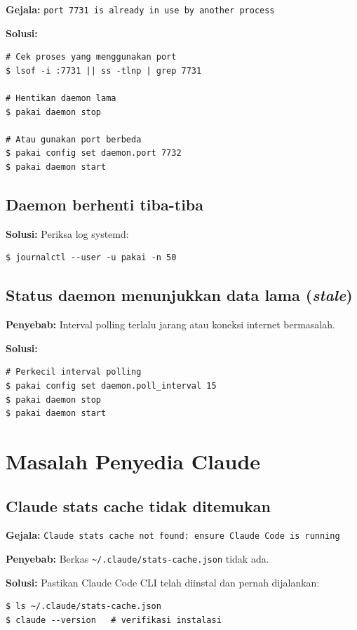 \textbf{Gejala:} \texttt{port 7731 is already in use by another process}

\textbf{Solusi:}
\begin{lstlisting}[style=terminal]
# Cek proses yang menggunakan port
$ lsof -i :7731 || ss -tlnp | grep 7731

# Hentikan daemon lama
$ pakai daemon stop

# Atau gunakan port berbeda
$ pakai config set daemon.port 7732
$ pakai daemon start
\end{lstlisting}

\subsection{Daemon berhenti tiba-tiba}

\textbf{Solusi:} Periksa log systemd:
\begin{lstlisting}[style=terminal]
$ journalctl --user -u pakai -n 50
\end{lstlisting}

\subsection{Status daemon menunjukkan data lama (\textit{stale})}

\textbf{Penyebab:} Interval polling terlalu jarang atau koneksi internet bermasalah.

\textbf{Solusi:}
\begin{lstlisting}[style=terminal]
# Perkecil interval polling
$ pakai config set daemon.poll_interval 15
$ pakai daemon stop
$ pakai daemon start
\end{lstlisting}

\section{Masalah Penyedia Claude}

\subsection{Claude stats cache tidak ditemukan}

\textbf{Gejala:} \texttt{Claude stats cache not found: ensure Claude Code is running}

\textbf{Penyebab:} Berkas \texttt{\textasciitilde/.claude/stats-cache.json} tidak ada.

\textbf{Solusi:} Pastikan Claude Code CLI telah diinstal dan pernah dijalankan:
\begin{lstlisting}[style=terminal]
$ ls ~/.claude/stats-cache.json
$ claude --version   # verifikasi instalasi
\end{lstlisting}

